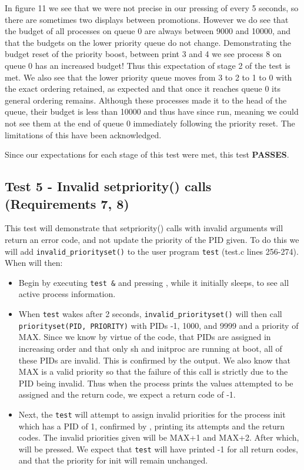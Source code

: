 \documentclass[11pt,letterpaper]{report}
\begin{document}
In figure 11 we see that we were not precise in our pressing of  every 5 seconds, so there are sometimes two displays between promotions. 
However we do see that the budget of all processes on queue 0 are always between 9000 and 10000, and that the budgets on the lower priority queue do not change. Demonstrating the budget reset of the priority boost, between  print 3 and 4 we see process 8 on queue 0 has an increased budget! Thus this expectation of stage 2 of the test is met. We also see that the lower priority queue moves from 3 to 2 to 1 to 0 with the exact ordering retained, as expected and that once it reaches queue 0 its general ordering remains. Although these processes made it to the head of the queue, their budget is less than 10000 and thus have since run, meaning we could not see them at the end of queue 0 immediately following the priority reset. The limitations of this have been acknowledged.

Since our expectations for each stage of this test were met, this test \textbf{PASSES}.

\subsection*{Test 5 - Invalid setpriority() calls (Requirements 7, 8) }
This test will demonstrate that setpriority() calls with invalid arguments will return an error code, and not update the priority of the PID given.
To do this we will add {\tt invalid\_priorityset()} to the user program {\tt test} (test.c lines 256-274). When will then:

\begin{itemize}
	\item Begin by executing {\tt test \&} and pressing , while it initially sleeps, to see all active process information.

	\item 
		When {\tt test} wakes after 2 seconds, {\tt invalid\_priorityset()} will then call {\tt priorityset(PID, PRIORITY)} with PIDs -1, 1000, and 9999 and a priority of MAX. 
		Since we know by virtue of the code, that PIDs
		are assigned in increasing order and that only sh and initproc are running at boot, all of these PIDs are invalid. This is confirmed by the  output. We also know that MAX is a valid priority so that the failure of this call is strictly due to the PID  being invalid.
		Thus when the process prints the values attempted to be assigned and the return code, we expect a return code of -1. 

	\item Next, the {\tt test} will attempt to assign invalid priorities for the process init which has a PID of 1, confirmed by , printing its attempts and the return codes. The invalid priorities given will be MAX+1 and MAX+2. After which,  will be pressed. We expect that {\tt test} will have printed -1 for all return codes, and that the priority for init will remain unchanged. 
\end{itemize}
\end{document}
